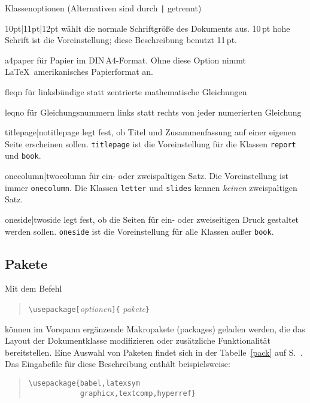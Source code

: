 \begin{table}[hbpt]
\caption[Klassenoptionen]{Klassenoptionen (Alternativen sind durch \texttt{|}
  getrennt)} \label{options}
\oben{11cm}
\begin{ttdescription}%
\item [10pt|11pt|12pt] wählt die normale Schriftgröße des Dokuments aus.
  10\,pt hohe Schrift ist die Voreinstellung; diese Beschreibung benutzt 11\,pt.

\item[a4paper] für Papier im DIN\,A4-Format. Ohne diese
  Option nimmt \LaTeX\ amerikanisches Papierformat an.
 
\item [fleqn] für linksbündige statt zentrierte mathematische
  Gleichungen
 
\item [leqno] für Gleichungsnummern links statt rechts von jeder
  numerierten Gleichung
 
\item [titlepage|notitlepage] legt fest, ob Titel und Zusammenfassung
  auf einer eigenen Seite erscheinen sollen.  \texttt{titlepage} ist
  die Voreinstellung für die Klassen \texttt{report} und \texttt{book}.
 
\item [onecolumn|twocolumn] für ein- oder zweispaltigen Satz.
 Die Voreinstellung ist immer \texttt{onecolumn}.  
 Die Klassen \texttt{letter} und \texttt{slides} kennen \emph{keinen}
 zweispaltigen Satz.
 
\item [oneside|twoside] legt fest, ob die Seiten für ein- oder
  zweiseitigen  Druck gestaltet werden sollen.  
  \texttt{oneside} ist die Voreinstellung für
  alle Klassen außer \texttt{book}.
  
\end{ttdescription}
\unten
\end{table}



\subsection{Pakete}\label{packages}
 
Mit dem Befehl
\begin{verse}
\verb:\usepackage[:\textit{optionen}\verb:]{:%
  \textit{pakete}\verb:}:
\end{verse}
können im Vorspann ergänzende Makropakete (packages) geladen werden,
die das Layout der Dokumentklasse
modifizieren oder zusätzliche Funktionalität bereitstellen.
Eine Auswahl von Paketen findet sich in der Tabelle~\ref{pack} 
auf S.~\pageref{pack}.
Das Eingabefile für diese Beschreibung enthält beispielsweise:
\begin{verse}
\verb|\usepackage{babel,latexsym|\\
\verb|            graphicx,textcomp,hyperref}|
\end{verse}


